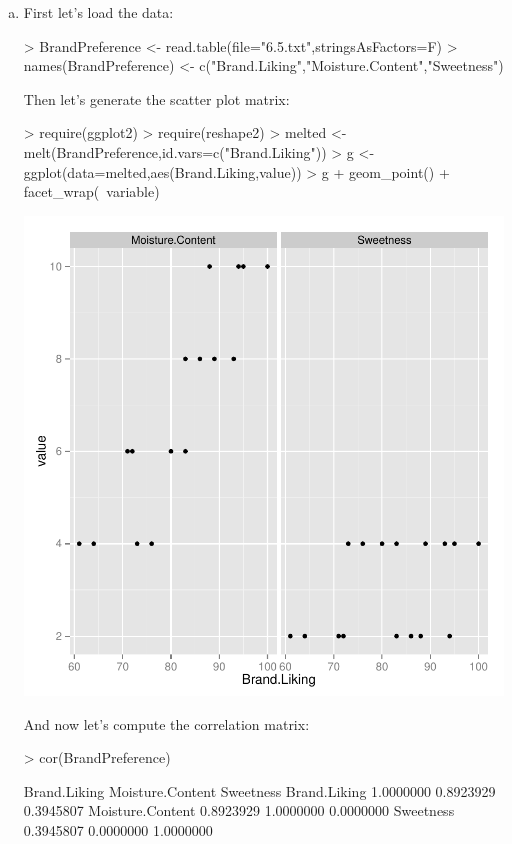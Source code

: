 \documentclass{article}
\begin{document}
\begin{enumerate}[a)]
\item{} First let's load the data:

\begin{Schunk}
\begin{Sinput}
> BrandPreference <- read.table(file="6.5.txt",stringsAsFactors=F)
> names(BrandPreference) <- c("Brand.Liking","Moisture.Content","Sweetness")
\end{Sinput}
\end{Schunk}

Then let's generate the scatter plot matrix:

\begin{Schunk}
\begin{Sinput}
> require(ggplot2)
> require(reshape2)
> melted <- melt(BrandPreference,id.vars=c("Brand.Liking"))
> g <- ggplot(data=melted,aes(Brand.Liking,value))
> g + geom_point() + facet_wrap(~variable)
\end{Sinput}
\end{Schunk}
\includegraphics{Fig-scatterplot}

And now let's compute the correlation matrix:

\begin{Schunk}
\begin{Sinput}
> cor(BrandPreference)
\end{Sinput}
\begin{Soutput}
                 Brand.Liking Moisture.Content Sweetness
Brand.Liking        1.0000000        0.8923929 0.3945807
Moisture.Content    0.8923929        1.0000000 0.0000000
Sweetness           0.3945807        0.0000000 1.0000000
\end{Soutput}
\end{Schunk}


\end{enumerate}
\end{document}
